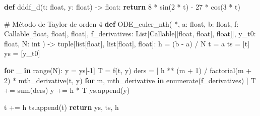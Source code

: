 \documentclass[
  letterpaper,
  DIV=11,
  numbers=noendperiod]{scrartcl}
\newenvironment{Shaded}{\begin{snugshade}}{\end{snugshade}}
\newcommand{\BuiltInTok}[1]{\textcolor[rgb]{0.00,0.23,0.31}{#1}}
\newcommand{\CommentTok}[1]{\textcolor[rgb]{0.37,0.37,0.37}{#1}}
\newcommand{\ControlFlowTok}[1]{\textcolor[rgb]{0.00,0.23,0.31}{\textbf{#1}}}
\newcommand{\DecValTok}[1]{\textcolor[rgb]{0.68,0.00,0.00}{#1}}
\newcommand{\KeywordTok}[1]{\textcolor[rgb]{0.00,0.23,0.31}{\textbf{#1}}}
\newcommand{\NormalTok}[1]{\textcolor[rgb]{0.00,0.23,0.31}{#1}}
\newcommand{\OperatorTok}[1]{\textcolor[rgb]{0.37,0.37,0.37}{#1}}
\begin{document}
\begin{Shaded}
\begin{Highlighting}[]
\KeywordTok{def}\NormalTok{ dddf\_d(t: }\BuiltInTok{float}\NormalTok{, y: }\BuiltInTok{float}\NormalTok{) }\OperatorTok{{-}\textgreater{}} \BuiltInTok{float}\NormalTok{:}
    \ControlFlowTok{return} \DecValTok{8} \OperatorTok{*}\NormalTok{ sin(}\DecValTok{2} \OperatorTok{*}\NormalTok{ t) }\OperatorTok{{-}} \DecValTok{27} \OperatorTok{*}\NormalTok{ cos(}\DecValTok{3} \OperatorTok{*}\NormalTok{ t)}


\CommentTok{\# Método de Taylor de orden 4}
\KeywordTok{def}\NormalTok{ ODE\_euler\_nth(}
    \OperatorTok{*}\NormalTok{,}
\NormalTok{    a: }\BuiltInTok{float}\NormalTok{,}
\NormalTok{    b: }\BuiltInTok{float}\NormalTok{,}
\NormalTok{    f: Callable[[}\BuiltInTok{float}\NormalTok{, }\BuiltInTok{float}\NormalTok{], }\BuiltInTok{float}\NormalTok{],}
\NormalTok{    f\_derivatives: List[Callable[[}\BuiltInTok{float}\NormalTok{, }\BuiltInTok{float}\NormalTok{], }\BuiltInTok{float}\NormalTok{]],}
\NormalTok{    y\_t0: }\BuiltInTok{float}\NormalTok{,}
\NormalTok{    N: }\BuiltInTok{int}
\NormalTok{) }\OperatorTok{{-}\textgreater{}} \BuiltInTok{tuple}\NormalTok{[}\BuiltInTok{list}\NormalTok{[}\BuiltInTok{float}\NormalTok{], }\BuiltInTok{list}\NormalTok{[}\BuiltInTok{float}\NormalTok{], }\BuiltInTok{float}\NormalTok{]:}
\NormalTok{    h }\OperatorTok{=}\NormalTok{ (b }\OperatorTok{{-}}\NormalTok{ a) }\OperatorTok{/}\NormalTok{ N}
\NormalTok{    t }\OperatorTok{=}\NormalTok{ a}
\NormalTok{    ts }\OperatorTok{=}\NormalTok{ [t]}
\NormalTok{    ys }\OperatorTok{=}\NormalTok{ [y\_t0]}

    \ControlFlowTok{for}\NormalTok{ \_ }\KeywordTok{in} \BuiltInTok{range}\NormalTok{(N):}
\NormalTok{        y }\OperatorTok{=}\NormalTok{ ys[}\OperatorTok{{-}}\DecValTok{1}\NormalTok{]}
\NormalTok{        T }\OperatorTok{=}\NormalTok{ f(t, y)}
\NormalTok{        ders }\OperatorTok{=}\NormalTok{ [}
\NormalTok{            h }\OperatorTok{**}\NormalTok{ (m }\OperatorTok{+} \DecValTok{1}\NormalTok{) }\OperatorTok{/}\NormalTok{ factorial(m }\OperatorTok{+} \DecValTok{2}\NormalTok{) }\OperatorTok{*}\NormalTok{ mth\_derivative(t, y)}
            \ControlFlowTok{for}\NormalTok{ m, mth\_derivative }\KeywordTok{in} \BuiltInTok{enumerate}\NormalTok{(f\_derivatives)}
\NormalTok{        ]}
\NormalTok{        T }\OperatorTok{+=} \BuiltInTok{sum}\NormalTok{(ders)}
\NormalTok{        y }\OperatorTok{+=}\NormalTok{ h }\OperatorTok{*}\NormalTok{ T}
\NormalTok{        ys.append(y)}

\NormalTok{        t }\OperatorTok{+=}\NormalTok{ h}
\NormalTok{        ts.append(t)}
    \ControlFlowTok{return}\NormalTok{ ys, ts, h}



\end{Highlighting}
\end{Shaded}
\end{document}
